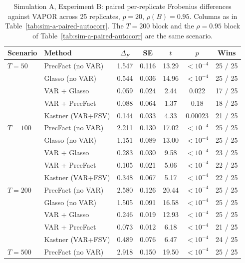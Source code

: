 \begin{table}[h!]
\centering
\small
\caption{Simulation A, Experiment B: paired per-replicate Frobenius differences against VAPOR across 25 replicates, $p=20$, $\rho(B)=0.95$. Columns as in Table~\ref{tab:sim-a-paired-autocorr}. The $T = 200$ block and the $\rho = 0.95$ block of Table~\ref{tab:sim-a-paired-autocorr} are the same scenario.}
\label{tab:sim-a-paired-samplesize}
\begin{tabular}{llccccc}
\toprule
Scenario & Method & $\Delta_F$ & SE & $t$ & $p$ & Wins \\
\midrule
$T = 50$   & PrecFact (no VAR)  & 1.547 & 0.116 & 13.29 & $<10^{-4}$ & 25 / 25 \\
           & Glasso (no VAR)    & 0.544 & 0.036 & 14.96 & $<10^{-4}$ & 25 / 25 \\
           & VAR + Glasso       & 0.059 & 0.024 &  2.44 & 0.022      & 17 / 25 \\
           & VAR + PrecFact     & 0.088 & 0.064 &  1.37 & 0.18      & 18 / 25 \\
           & Kastner (VAR+FSV)  & 0.144 & 0.033 &  4.33 & 0.00023     & 21 / 25 \\
\midrule
$T = 100$  & PrecFact (no VAR)  & 2.211 & 0.130 & 17.02 & $<10^{-4}$ & 25 / 25 \\
           & Glasso (no VAR)    & 1.151 & 0.089 & 13.00 & $<10^{-4}$ & 25 / 25 \\
           & VAR + Glasso       & 0.283 & 0.030 &  9.58 & $<10^{-4}$ & 23 / 25 \\
           & VAR + PrecFact     & 0.105 & 0.021 &  5.06 & $<10^{-4}$ & 22 / 25 \\
           & Kastner (VAR+FSV)  & 0.348 & 0.067 &  5.17 & $<10^{-4}$ & 22 / 25 \\
\midrule
$T = 200$  & PrecFact (no VAR)  & 2.580 & 0.126 & 20.44 & $<10^{-4}$ & 25 / 25 \\
           & Glasso (no VAR)    & 1.505 & 0.091 & 16.58 & $<10^{-4}$ & 25 / 25 \\
           & VAR + Glasso       & 0.246 & 0.019 & 12.93 & $<10^{-4}$ & 25 / 25 \\
           & VAR + PrecFact     & 0.073 & 0.012 &  6.18 & $<10^{-4}$ & 21 / 25 \\
           & Kastner (VAR+FSV)  & 0.489 & 0.076 &  6.47 & $<10^{-4}$ & 24 / 25 \\
\midrule
$T = 500$  & PrecFact (no VAR)  & 2.918 & 0.150 & 19.50 & $<10^{-4}$ & 25 / 25 \\

\end{tabular}
\end{table}
